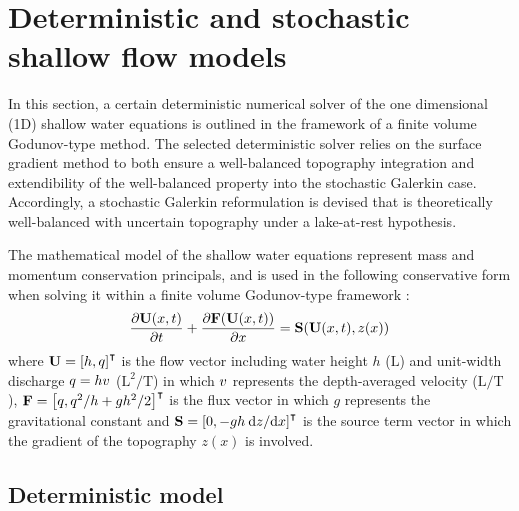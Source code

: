 \section{Deterministic and stochastic shallow flow models}

In this section, a certain deterministic numerical solver of the one dimensional (1D) shallow water equations is outlined in the framework of a finite volume Godunov-type method.
The selected deterministic solver relies on the surface gradient method \citep{zhou2001} to both ensure a well-balanced topography integration and extendibility of the well-balanced property into the stochastic Galerkin case. 
Accordingly, a stochastic Galerkin reformulation is devised that is theoretically well-balanced with uncertain topography under a lake-at-rest hypothesis.

The mathematical model of the shallow water equations represent mass and momentum
conservation principals, and is used in the following conservative form when solving it within a finite volume Godunov-type framework \citep{toro-garcianavarro2007}:
\begin{align}
\frac{\partial \mathbf{U}(x, t)}{\partial t} + \frac{\partial \mathbf{F}(\mathbf{U}(x, t))}{\partial x} = \mathbf{S}(\mathbf{U}(x, t), z(x)) \label{eqn:swe}
\end{align}
where $\mathbf{U} = \left[ h, q \right]^\intercal$ is the flow vector including water height $h$ ($\mathrm{L}$) and unit-width discharge $q = hv$ ($\mathrm{L}^2/\mathrm{T}$) in which $v$ represents the depth-averaged velocity ($\mathrm{L}/\mathrm{T}$), $\mathbf{F} = \left[ q,  q^2/h + gh^2/2 \right]^\intercal$ is the flux vector in which $g$ represents the gravitational constant and $\mathbf{S} = \left[ 0, -gh \: \mathrm{d} z / \mathrm{d} x \right]^\intercal$ is the source term vector in which the gradient of the topography $z(x)$ is involved.

\subsection{Deterministic model}

